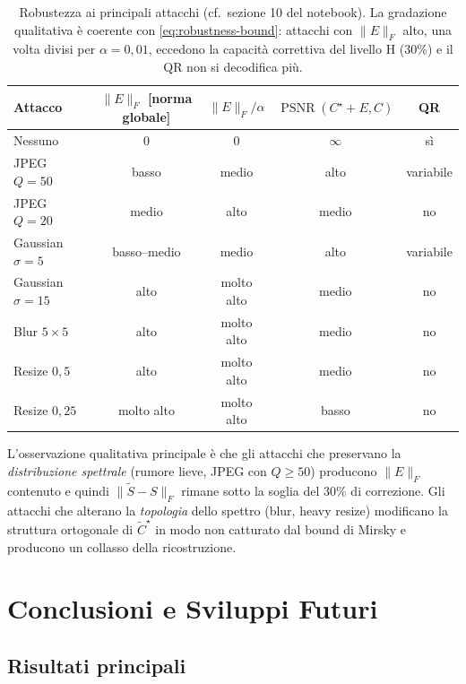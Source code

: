 \documentclass[11pt,a4paper]{article}
\theoremstyle{definition}
\theoremstyle{remark}
\DeclareMathOperator{\PSNR}{PSNR}
\begin{document}
\begin{table}[H]\centering\small
\begin{tabular}{lcccc}
\toprule
\textbf{Attacco} & $\|E\|_F$ [norma globale] & $\|E\|_F/\alpha$ &
$\PSNR(C^{\star}+E, C)$ & \textbf{QR} \\
\midrule
Nessuno              & $0$        & $0$       & $\infty$     & sì       \\
JPEG $Q=50$          & basso      & medio     & alto         & variabile \\
JPEG $Q=20$          & medio      & alto      & medio        & no       \\
Gaussian $\sigma=5$  & basso--medio & medio   & alto         & variabile \\
Gaussian $\sigma=15$ & alto       & molto alto & medio       & no       \\
Blur $5\times 5$     & alto       & molto alto & medio       & no       \\
Resize $0{,}5$       & alto       & molto alto & medio       & no       \\
Resize $0{,}25$      & molto alto & molto alto & basso       & no       \\
\bottomrule
\end{tabular}
\caption{Robustezza ai principali attacchi (cf.\ sezione 10 del
notebook).  La gradazione qualitativa è coerente con
\eqref{eq:robustness-bound}: attacchi con $\|E\|_F$ alto, una volta
divisi per $\alpha = 0{,}01$, eccedono la capacità correttiva del
livello H (30\%) e il QR non si decodifica più.}
\end{table}

L'osservazione qualitativa principale è che gli attacchi che
preservano la \emph{distribuzione spettrale} (rumore lieve, JPEG con
$Q\geq 50$) producono $\|E\|_F$ contenuto e quindi
$\|\widetilde S - S\|_F$ rimane sotto la soglia del 30\% di correzione.
Gli attacchi che alterano la \emph{topologia} dello spettro (blur,
heavy resize) modificano la struttura ortogonale di $\widetilde
C^{\star}$ in modo non catturato dal bound di Mirsky e producono un
collasso della ricostruzione.


\section{Conclusioni e Sviluppi Futuri}

\subsection{Risultati principali}
\end{document}
